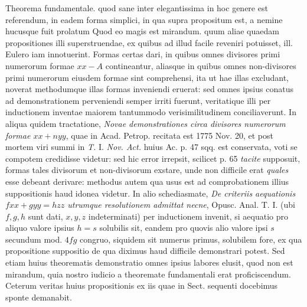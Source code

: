 Theorema fundamentale. quod sane inter elegantissima in hoc genere est referendum, in eadem forma simplici, in qua supra propositum est, a nemine hucusque fuit prolatum Quod eo magis est mirandum. quum aliae quaedam propositiones illi superstruendae, ex quibus ad illud facile reveniri potuisset, ill. Eulero iam innotuerint. Formas certas dari, in quibus omnes divisores primi numerorum formae $xx-A$ contineantur, aliasque in quibus omnes non-divisores primi numerorum eiusdem formae sint comprehensi, ita ut hae illas excludant, noverat methodumque illas formas inveniendi eruerat: sed omnes ipsius conatus ad demonstrationem perveniendi semper irriti fuerunt, veritatique illi per inductionem inventae maiorem tantummodo verisimilitudinem conciliaverunt. In aliqua quidem tractatione, \textit{Novae demonstrationes circa divisores numerorum formae $xx+nyy$}, quae in Acad. Petrop. recitata est 1775 Nov. 20, et post mortem viri summi in \textit{T.} I. \textit{Nov. Act.} huius Ac. p. 47 sqq. est conservata, voti se compotem credidisse videtur: sed hic error irrepsit, scilicet p. 65 \textit{tacite} supposuit, formas tales divisorum et non-divisorum exstare, unde non difficile erat \textit{quales} esse debeant derivare: methodus autem qua usus est ad comprobationem illius suppositionis haud
idonea videtur. In alio schediasmate, \textit{De criteriis aequationis $fxx+gyy=hzz$ utrumque resolutionem admittat necne}, Opusc. Anal. T. I. (ubi $f,g,h$ sunt dati, $x,y,z$ indeterminati) per inductionem invenit, si aequatio pro aliquo valore ipsius $h=s$ solubilis sit, eandem pro quovis alio valore ipsi $s$ secundum mod. $4fg$ congruo, siquidem sit numerus primus, solubilem fore, ex qua propositione suppositio de qua diximus haud difficile demonstrari potest. Sed etiam huius theorematis demonstratio omnes ipsius labores elusit, quod non est mirandum, quia nostro iudicio a theoremate fundamentali erat proficiscendum. Ceterum veritas huius propositionis ex iis quae in Sect. sequenti docebimus sponte demanabit.

